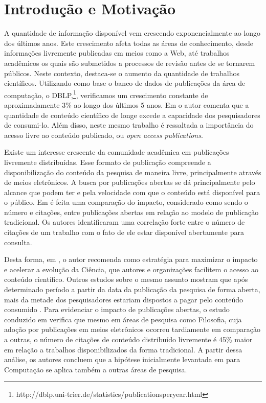 \chapter{Introdução e Motivação}
A quantidade de informação disponível vem crescendo exponencialmente ao longo dos últimos anos. Este crescimento afeta todas as áreas de conhecimento, desde informações livremente publicadas em meios como a Web, até trabalhos acadêmicos os quais são submetidos a processos de revisão antes de se tornarem públicos. Neste contexto, destaca-se o aumento da quantidade de trabalhos científicos. Utilizando como base o banco de dados de publicações da área de computação, o DBLP,\footnote{http://dblp.uni-trier.de/statistics/publicationsperyear.html}, verificamos um crescimento constante de aproximadamente 3\% ao longo dos últimos 5 anos. Em \cite{Online2001} o autor comenta que a quantidade de conteúdo científico de longe excede a capacidade dos pesquisadores de consumi-lo. Além disso, neste mesmo trabalho é ressaltada a importância do acesso livre ao conteúdo publicado, ou \textit{open access publications}.

Existe um interesse crescente da comunidade acadêmica em publicações livremente distribuídas. Esse formato de publicação compreende a disponibilização do conteúdo da pesquisa de maneira livre, principalmente através de meios eletrônicos. A busca por publicações abertas se dá principalmente pelo alcance que podem ter e pela velocidade com que o conteúdo está disponível para o público. Em \cite{Comparing2004} é feita uma comparação do impacto, considerado como sendo o número e citações, entre publicações abertas em relação ao modelo de publicação tradicional. Os autores identificaram uma correlação forte entre o número de citações de um trabalho com o fato de ele estar disponível abertamente para consulta.

Desta forma, em \cite{Online2001}, o autor recomenda como estratégia para maximizar o impacto e acelerar a evolução da Ciência, que autores e organizações facilitem o acesso ao conteúdo científico. Outros estudos sobre o mesmo assunto mostram que após determinado período a partir da data da publicação da pesquisa de forma aberta, mais da metade dos pesquisadores estariam dispostos a pagar pelo conteúdo consumido \cite{Societies2002Misc}. Para evidenciar o impacto de publicações abertas, o estudo conduzido em \cite{OpenAccessImpact2004} verifica que mesmo em áreas de pesquisa como Filosofia, cuja adoção por publicações em meios eletrônicos ocorreu tardiamente em comparação a outras, o número de citações de conteúdo distribuído livremente é 45\% maior em relação a trabalhos disponibilizados da forma tradicional. A partir dessa análise, os autores concluem que a hipótese inicialmente levantada em \cite{Online2001} para Computação se aplica também a outras áreas de pesquisa.

